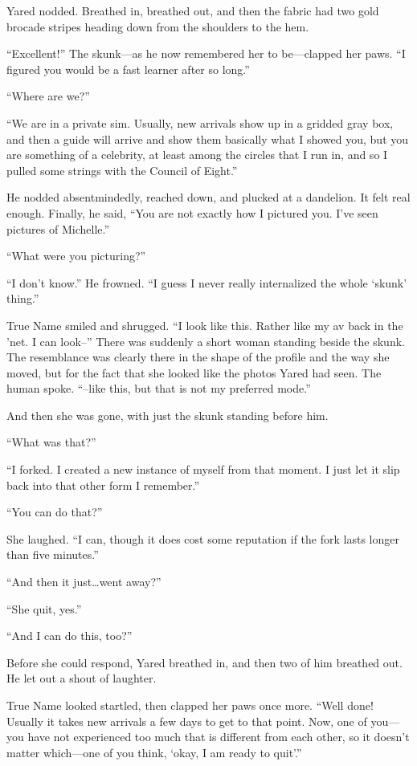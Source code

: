 Yared nodded. Breathed in, breathed out, and then the fabric had two gold brocade stripes heading down from the shoulders to the hem.

``Excellent!'' The skunk---as he now remembered her to be---clapped her paws. ``I figured you would be a fast learner after so long.''

``Where are we?''

``We are in a private sim. Usually, new arrivals show up in a gridded gray box, and then a guide will arrive and show them basically what I showed you, but you are something of a celebrity, at least among the circles that I run in, and so I pulled some strings with the Council of Eight.''

He nodded absentmindedly, reached down, and plucked at a dandelion. It felt real enough. Finally, he said, ``You are not exactly how I pictured you. I've seen pictures of Michelle.''

``What were you picturing?''

``I don't know.'' He frowned. ``I guess I never really internalized the whole `skunk' thing.''

True Name smiled and shrugged. ``I look like this. Rather like my av back in the 'net. I can look--'' There was suddenly a short woman standing beside the skunk. The resemblance was clearly there in the shape of the profile and the way she moved, but for the fact that she looked like the photos Yared had seen. The human spoke. ``--like this, but that is not my preferred mode.''

And then she was gone, with just the skunk standing before him.

``What was that?''

``I forked. I created a new instance of myself from that moment. I just let it slip back into that other form I remember.''

``You can do that?''

She laughed. ``I can, though it does cost some reputation if the fork lasts longer than five minutes.''

``And then it just\ldots went away?''

``She quit, yes.''

``And I can do this, too?''

Before she could respond, Yared breathed in, and then two of him breathed out. He let out a shout of laughter.

True Name looked startled, then clapped her paws once more. ``Well done! Usually it takes new arrivals a few days to get to that point. Now, one of you---you have not experienced too much that is different from each other, so it doesn't matter which---one of you think, `okay, I am ready to quit'.''

